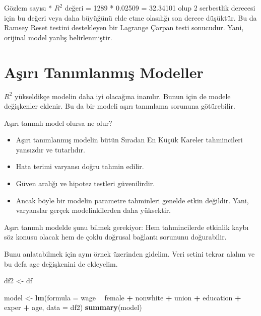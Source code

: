 \documentclass[
]{book}
\newenvironment{Shaded}{\begin{snugshade}}{\end{snugshade}}
\newcommand{\DataTypeTok}[1]{\textcolor[rgb]{0.13,0.29,0.53}{#1}}
\newcommand{\KeywordTok}[1]{\textcolor[rgb]{0.13,0.29,0.53}{\textbf{#1}}}
\newcommand{\NormalTok}[1]{#1}
\newcommand{\OperatorTok}[1]{\textcolor[rgb]{0.81,0.36,0.00}{\textbf{#1}}}
\newcommand{\StringTok}[1]{\textcolor[rgb]{0.31,0.60,0.02}{#1}}
\begin{document}
Gözlem sayısı * \(R^2\) değeri = 1289 * 0.02509 = 32.34101 olup 2 serbestlik derecesi için bu değeri veya daha büyüğünü elde etme olasılığı son derece düşüktür. Bu da Ramsey Reset testini destekleyen bir Lagrange Çarpan testi sonucudur. Yani, orijinal model yanlış belirlenmiştir.

\hypertarget{aux15fux131rux131-tanux131mlanmux131ux15f-modeller}{%
\section{Aşırı Tanımlanmış Modeller}\label{aux15fux131rux131-tanux131mlanmux131ux15f-modeller}}

\(R^2\) yükseldikçe modelin daha iyi olacağına inanılır. Bunun için de modele değişkenler eklenir. Bu da bir modeli aşırı tanımlama sorununa götürebilir.

Aşırı tanımlı model olursa ne olur?

\begin{itemize}
\item
  Aşırı tanımlanmış modelin bütün Sıradan En Küçük Kareler tahmincileri yansızdır ve tutarlıdır.
\item
  Hata terimi varyansı doğru tahmin edilir.
\item
  Güven aralığı ve hipotez testleri güvenilirdir.
\item
  Ancak böyle bir modelin parametre tahminleri genelde etkin değildir. Yani, varyanslar gerçek modelinkilerden daha yüksektir.
\end{itemize}

Aşırı tanımlı modelde şunu bilmek gerekiyor: Hem tahmincilerde etkinlik kaybı söz konusu olacak hem de çoklu doğrusal bağlantı sorununu doğurabilir.

Bunu anlatabilmek için aynı örnek üzerinden gidelim. Veri setini tekrar alalım ve bu defa age değişkenini de ekleyelim.

\begin{Shaded}
\begin{Highlighting}[]
\NormalTok{df2 <-}\StringTok{ }\NormalTok{df}

\NormalTok{model <-}\StringTok{ }\KeywordTok{lm}\NormalTok{(}\DataTypeTok{formula =}\NormalTok{ wage }\OperatorTok{~}\StringTok{ }\NormalTok{female }\OperatorTok{+}\StringTok{ }\NormalTok{nonwhite }\OperatorTok{+}\StringTok{ }\NormalTok{union }\OperatorTok{+}\StringTok{ }\NormalTok{education }\OperatorTok{+}\StringTok{ }\NormalTok{exper }\OperatorTok{+}\StringTok{ }\NormalTok{age, }\DataTypeTok{data =}\NormalTok{ df2)}
\KeywordTok{summary}\NormalTok{(model)}
\end{Highlighting}
\end{Shaded}
\end{document}
